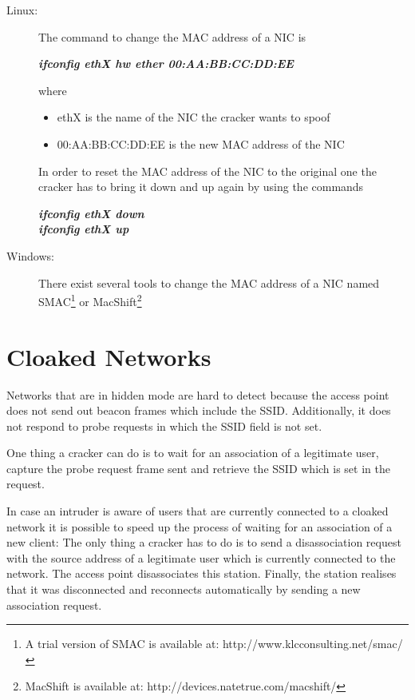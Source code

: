 \begin{description}

\item [Linux:] The command to change the MAC address of a NIC is

	{\em {\bf ifconfig ethX hw ether 00:AA:BB:CC:DD:EE}}

	where
	\begin{itemize}
		\item ethX is the name of the NIC the cracker wants to spoof
		\item 00:AA:BB:CC:DD:EE is the new MAC address of the NIC
	\end{itemize}
	
	In order to reset the MAC address of the NIC to the original one the cracker has to bring it down and up again by using the commands
	
	{\em {\bf ifconfig ethX down}} \\
	{\em {\bf ifconfig ethX up}}
	
\item [Windows:] There exist several tools to change the MAC address
	of a NIC named SMAC\footnote{A trial version of SMAC is available at:
	http://www.klcconsulting.net/smac/} or MacShift\footnote{MacShift is available at: http://devices.natetrue.com/macshift/}	

\end{description}


\section{Cloaked Networks}

Networks that are in hidden mode are hard to detect because the access point does not send out beacon frames which include the SSID. Additionally, it does not respond to probe requests in which the SSID field is not set.

One thing a cracker can do is to wait for an association of a legitimate user, capture the probe request frame sent and retrieve the SSID which is set in the request.

In case an intruder is aware of users that are currently connected to a cloaked network it is possible to speed up the process of waiting for an association of a new client: The only thing a cracker has to do is to send a disassociation request with the source address of a legitimate user which is currently connected to the network. The access point disassociates this station. Finally, the station realises that it was disconnected and reconnects automatically by sending a new association request.

